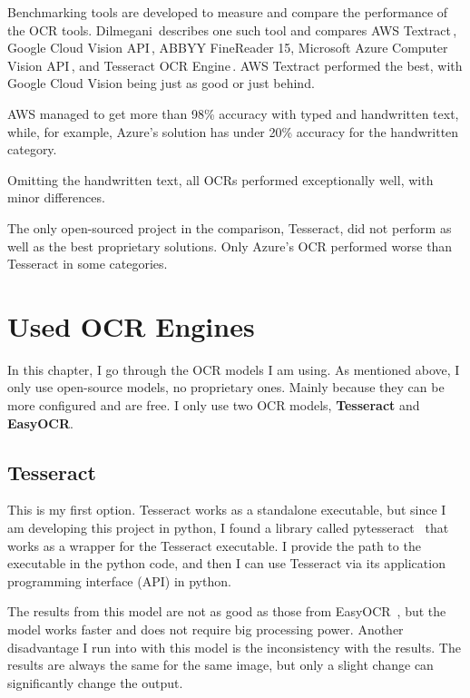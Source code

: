 \documentclass[
  digital,     %
  oneside,     %
  nosansbold,  %
  nocolorbold, %
  nolof,         %
  nolot,         %
]{fithesis4}
\begin{document}
Benchmarking tools are developed to measure and compare the performance of the OCR tools. Dilmegani\,\cite{benchmark} describes one such tool and compares AWS Textract\,\cite{awstextract}, Google Cloud Vision API\,\cite{googleapi}, ABBYY FineReader 15, Microsoft Azure Computer Vision API\,\cite{azurevision}, and Tesseract OCR Engine\,\cite{tesseract}. AWS Textract performed the best, with Google Cloud Vision being just as good or just behind.

AWS managed to get more than 98\% accuracy with typed and handwritten text, while, for example, Azure's solution has under 20\% accuracy for the handwritten category.

Omitting the handwritten text, all OCRs performed exceptionally well, with minor differences.

The only open-sourced project in the comparison, Tesseract, did not perform as well as the best proprietary solutions. Only Azure's OCR performed worse than Tesseract in some categories.

\chapter{Used OCR Engines}\label{chap:ocr-engines}

In this chapter, I go through the OCR models I am using. As mentioned above, I only use open-source models, no proprietary ones. Mainly because they can be more configured and are free. I only use two OCR models, \textbf{Tesseract} and \textbf{EasyOCR}.

\section{Tesseract}\label{chap:ocr-tesseract}

This is my first option. Tesseract works as a standalone executable, but since I am developing this project in python, I found a library called pytesseract~\cite{pytesseract} that works as a wrapper for the Tesseract executable. I provide the path to the executable in the python code, and then I can use Tesseract via its application programming interface (API) in python.

The results from this model are not as good as those from EasyOCR~\cite{easyocr}, but the model works faster and does not require big processing power. Another disadvantage I run into with this model is the inconsistency with the results. The results are always the same for the same image, but only a slight change can significantly change the output.
\end{document}
